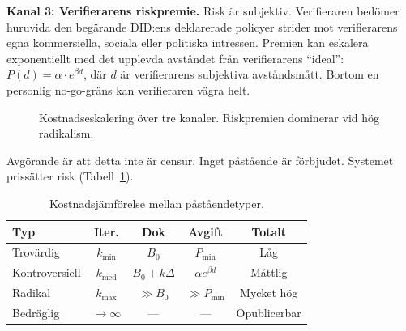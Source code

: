 \documentclass[11pt,a4paper,twocolumn]{article}
\begin{document}
\textbf{Kanal 3: Verifierarens riskpremie.} Risk är subjektiv. Verifieraren bedömer huruvida den begärande DID:ens deklarerade policyer strider mot verifierarens egna kommersiella, sociala eller politiska intressen. Premien kan eskalera exponentiellt med det upplevda avståndet från verifierarens ``ideal'': $P(d) = \alpha \cdot e^{\beta d}$, där $d$ är verifierarens subjektiva avståndsmått. Bortom en personlig no-go-gräns kan verifieraren vägra helt.

\begin{figure}[ht]
\centering
{}
\caption{Kostnadseskalering över tre kanaler. Riskpremien dominerar vid hög radikalism.}
\label{fig:radicalism}
\end{figure}

Avgörande är att detta inte är censur. Inget påstående är förbjudet. Systemet prissätter risk (Tabell~\ref{tab:costs}).

\begin{table}[ht]
\centering
\caption{Kostnadsjämförelse mellan påståendetyper.}
\label{tab:costs}
\footnotesize
\begin{tabular}{@{}lcccc@{}}
\toprule
\textbf{Typ} & \textbf{Iter.} & \textbf{Dok} & \textbf{Avgift} & \textbf{Totalt} \\
\midrule
Trovärdig & $k_{\min}$ & $B_0$ & $P_{\min}$ & Låg \\
Kontroversiell & $k_{\text{med}}$ & $B_0{+}k\Delta$ & $\alpha e^{\beta d}$ & Måttlig \\
Radikal & $k_{\max}$ & $\gg B_0$ & $\gg P_{\min}$ & Mycket hög \\
Bedräglig & $\to\infty$ & --- & --- & Opublicerbar \\
\bottomrule
\end{tabular}
\end{table}
\end{document}
